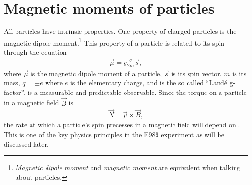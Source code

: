 \section{Magnetic moments of particles}
\label{sec:MDMs}

All particles have intrinsic properties. One property of charged particles is the magnetic dipole moment.\footnote{\textit{Magnetic dipole moment} and \textit{magnetic moment} are equivalent when talking about particles.} This property of a particle is related to its spin through the equation
		\begin{align}
            \vec{\mu} = g \frac{q}{2m} \vec{s},
        \label{eq:magneticmoment}
		\end{align}
where $\vec{\mu}$ is the magnetic dipole moment of a particle, $\vec{s}$ is its spin vector, $m$ is its mass, $q = \pm e$ where $e$ is the elementary charge, and \g is the so called ``Land\'{e} g-factor''. \g is a measurable and predictable observable. Since the torque on a particle in a magnetic field $\vec{B}$ is 
		\begin{align}
            \vec{N} = \vec{\mu} \times \vec{B},
        \label{eq:torque}
		\end{align}
the rate at which a particle's spin precesses in a magnetic field will depend on \g. This is one of the key physics principles in the E989 experiment as will be discussed later.

